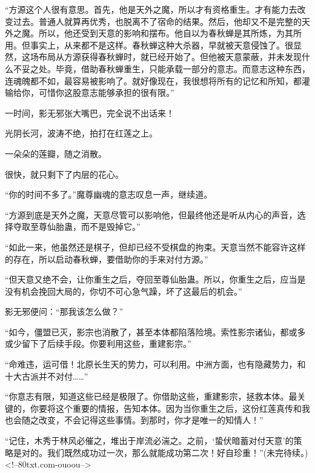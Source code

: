 \begin{this_body}
“方源这个人很有意思。首先，他是天外之魔，所以才有资格重生。才有能力去改变过去。普通人就算再优秀，也脱离不了宿命的结果。然后，他却又不是完整的天外之魔。所以，他还受到天意的影响和摆布。他自以为春秋蝉是其所炼，为其所用。但事实上，从来都不是这样。春秋蝉这种大杀器，早就被天意侵蚀了。很显然，这场布局从方源获得春秋蝉时，就已经开始了。但他被天意蒙蔽，并未发现什么不妥之处。毕竟，借助春秋蝉重生，只能承载一部分的意志。而意志这种东西，连魂魄都不如，最容易被影响了。就好像现在，我很想将所有的记忆和所知，都灌输给你，可惜你这股意志能够承担的很有限。”

一时间，影无邪张大嘴巴，完全说不出话来！

光阴长河，波涛不绝，拍打在红莲之上。

一朵朵的莲瓣，随之消散。

很快，就只剩下了内层的花心。

“你的时间不多了。”魔尊幽魂的意志叹息一声，继续道。

“方源到底是天外之魔，天意尽管可以影响他，但最终他还是听从内心的声音，选择夺取至尊仙胎蛊，而不是毁掉它。”

“如此一来，他虽然还是棋子，但却已经不受棋盘的拘束。天意当然不能容许这样的存在，所以启动春秋蝉，要借助你的手来对付方源。”

“但天意又绝不会，让你重生之后，夺回至尊仙胎蛊。所以，你重生之后，应当是没有机会挽回大局的，你切不可心急气躁，坏了这最后的机会。”

影无邪便问：“那我该怎么做？”

“如今，僵盟已灭，影宗也消散了，甚至本体都陷落险境。索性影宗诸仙，都或多或少留下了后续手段。你要利用这些，重建影宗。”

“命难违，运可借！北原长生天的势力，可以利用。中洲方面，也有隐藏势力，和十大古派并不对付……”

“你意志有限，知道这些已经是极限了。你借助这些，重建影宗，拯救本体。最关键的，你要将这个重要的情报，告知本体。因为当你重生之后，这份红莲真传和我也会随之改变，不会记得这些事情。到那时，你才是唯一的知情人！”

“记住，木秀于林风必催之，堆出于岸流必湍之。之前，‘蛰伏暗蓄对付天意’的策略是对的。我们既然成功过一次，那么就能成功第二次！好自珍重！”(未完待续。)<!--80txt.com-ouoou-->

\end{this_body}

